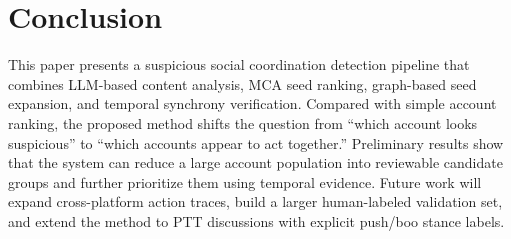 \documentclass[conference]{IEEEtran}
\begin{document}
\section{Conclusion}

This paper presents a suspicious social coordination detection pipeline that combines LLM-based content analysis, MCA seed ranking, graph-based seed expansion, and temporal synchrony verification. Compared with simple account ranking, the proposed method shifts the question from ``which account looks suspicious'' to ``which accounts appear to act together.'' Preliminary results show that the system can reduce a large account population into reviewable candidate groups and further prioritize them using temporal evidence. Future work will expand cross-platform action traces, build a larger human-labeled validation set, and extend the method to PTT discussions with explicit push/boo stance labels.
\end{document}
